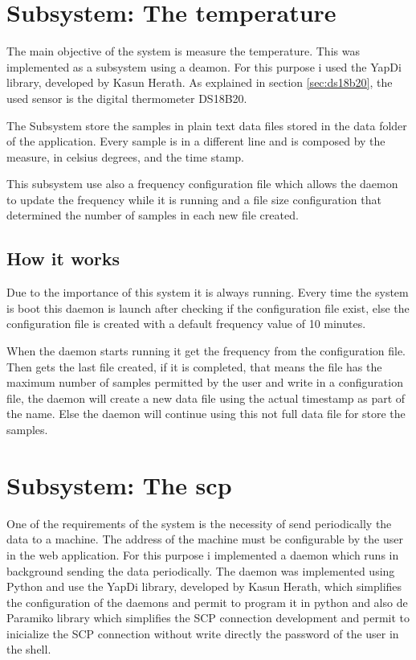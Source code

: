 	\section{Subsystem: The temperature} %
	The main objective of the system is measure the temperature. This was implemented as a subsystem using a deamon. For this purpose i used the YapDi library, developed by Kasun Herath. As explained in section \ref{sec:ds18b20}, the used sensor is the digital thermometer DS18B20. %

	The Subsystem store the samples in plain text data files stored in the data folder of the application. Every sample is in a different line and is composed by the measure, in celsius degrees, and the time stamp.

	This subsystem use also a frequency configuration file which allows the daemon to update the frequency while it is running and a file size configuration that determined the number of samples in each new file created.
		\subsection{How it works}
		Due to the importance of this system it is always running. Every time the system is boot this daemon is launch after checking if the configuration file exist, else the configuration file is created with a default frequency value of 10 minutes.

		When the daemon starts running it get the frequency from the configuration file. Then gets the last file created, if it is completed, that means the file has the maximum number of samples permitted by the user and write in a configuration file, the daemon will create a new data file using the actual timestamp as part of the name. Else the daemon will continue using this not full data file for store the samples.
		
	\section{Subsystem: The scp} %
	One of the requirements of the system is the necessity of send periodically the data to a machine. The address of the machine must be configurable by the user in the web application. For this purpose i implemented a daemon which runs in background sending the data periodically.
	The daemon was implemented using Python and use the YapDi library, developed by Kasun Herath, which simplifies the configuration of the daemons and permit to program it in python and also de Paramiko library which simplifies the SCP connection development and permit to inicialize the SCP connection without write directly the password of the user in the shell. %
